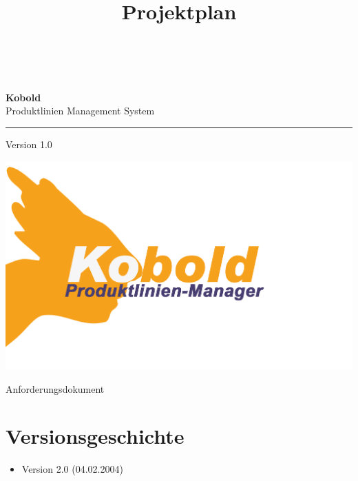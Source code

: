 \documentclass[a4paper,titlepage,12pt,ngerman]{scrbook}
\title {\huge \product\\[0.5cm]\large Projektplan \\[0.5cm] \version
  \\[1cm] \Large \company}
\newcommand\version{Version 1.0\xspace}
\begin{document}

\begin{titlepage}
\renewcommand{\thefootnote}{\fnsymbol{footnote}}
{\Huge
\raggedright
\textbf{\bf Kobold} \\
\huge Produktlinien Management System
\rule{\textwidth}{0.75pt}
\par
}
\begin{flushleft}
\normalsize
\version
\end{flushleft}

\vspace*{3cm}
\begin{center}
\includegraphics[width=15cm]{../common/logo-color.png}
\end{center}
\vfill

{\parindent=0cm
\Huge Anforderungsdokument
}


\setcounter{footnote}{0}
\end{titlepage}


\section*{Versionsgeschichte}

\begin{itemize}

\item Version 2.0  (04.02.2004)


\end{itemize}


\tableofcontents




%
\end{document}
